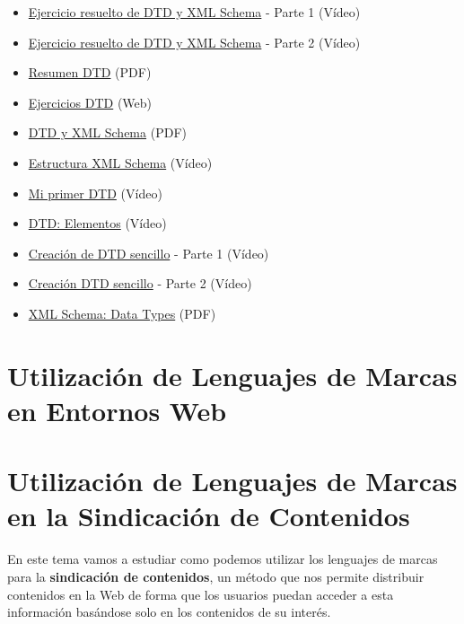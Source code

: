 \begin{itemize}
    \item  \href{https://www.youtube.com/watch?v=1qFhBPkQqEM&ab_channel=PepeLluyot}{Ejercicio resuelto de DTD y XML Schema} - Parte 1 (Vídeo)
    \item  \href{https://www.youtube.com/watch?v=m1dmbNjbeZA&ab_channel=PepeLluyot}{Ejercicio resuelto de DTD y XML Schema} - Parte 2 (Vídeo)
    \item  \href{https://educacionadistancia.juntadeandalucia.es/formacionprofesional/pluginfile.php/36335/mod_scorm/content/33/ResumenDTD.pdf}{Resumen DTD} (PDF)
    \item \href{https://www.mclibre.org/consultar/xml/ejercicios/dtd.html}{Ejercicios DTD} (Web)
    \item \href{https://educacionadistancia.juntadeandalucia.es/formacionprofesional/pluginfile.php/36335/mod_scorm/content/33/DTD_SCHEMA.pdf}{DTD y XML Schema} (PDF)
    \item \href{https://www.youtube.com/watch?v=JKhfLpkVh3o&ab_channel=Introducci%C3%B3naXML%28iXML%29}{Estructura XML Schema} (Vídeo)
    \item \href{https://www.youtube.com/watch?v=EfnWCeQNTQI&ab_channel=Introducci%C3%B3naXML%28iXML%29}{Mi primer DTD} (Vídeo)
    \item \href{https://www.youtube.com/watch?v=ryoW-B_6cGs&ab_channel=LoboTecnoKu}{DTD: Elementos} (Vídeo)
    \item \href{https://www.youtube.com/watch?v=fPU1ex7bSgg&ab_channel=LoboTecnoKu}{Creación de DTD sencillo} - Parte 1 (Vídeo)
    \item   \href{https://www.youtube.com/watch?v=4NB89iXyxMU&ab_channel=LoboTecnoKu}{Creación DTD sencillo} - Parte 2 (Vídeo)
    \item \href{https://educacionadistancia.juntadeandalucia.es/formacionprofesional/pluginfile.php/36335/mod_scorm/content/33/SchemaDataTypesQR-2.pdf}{XML Schema: Data Types} (PDF)
\end{itemize}

\chapter{Utilización de Lenguajes de Marcas en Entornos Web}

\chapter{Utilización de Lenguajes de Marcas en la Sindicación de Contenidos}
En este tema vamos a estudiar como podemos utilizar los lenguajes de marcas para la \textbf{sindicación de contenidos}, un método que nos permite distribuir contenidos en la Web de forma que los usuarios puedan acceder a esta información basándose solo en los contenidos de su interés.

